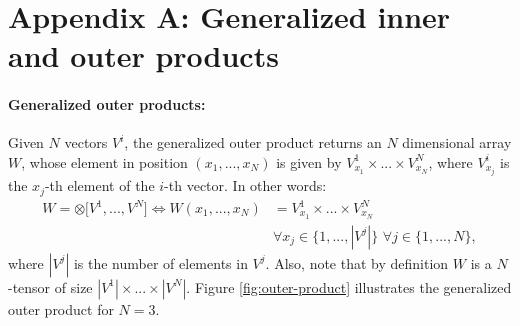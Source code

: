 \documentclass[twoside,11pt]{article}
\begin{document}


\vskip 0.2in


\appendix

\section*{Appendix A: Generalized inner and outer products}

\paragraph{Generalized outer products:}

Given $N$ vectors $V^i$, the generalized outer product returns an $N$ dimensional array $W$, whose element in position $(x_1,...,x_N)$ is given by $V^1_{x_1}\times ... \times V^N_{x_N}$, where $V^i_{x_j}$ is the $x_j$-th element of the $i$-th vector. In other words:
\begin{align}
W = \otimes \Big[ V^1, ..., V^N \Big] \Leftrightarrow W(x_1,...,x_N) &= V^1_{x_1}\times ... \times V^N_{x_N} \nonumber\\
&\forall x_j \in \{1, ..., |V^j|\} \,\, \forall j \in \{1, ..., N\},
\end{align}
where $|V^j|$ is the number of elements in $V^j$. Also, note that by definition $W$ is a $N$-tensor of size $|V^1| \times ... \times |V^N|$. Figure \ref{fig:outer-product} illustrates the generalized outer product for $N = 3$.
\end{document}
